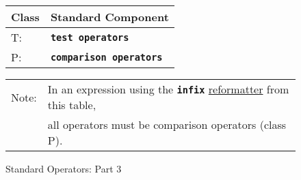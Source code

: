 \documentclass[12pt]{article}
\newcommand{\TT}[1]{{\tt \bfseries #1}}
\begin{document}
\begin{figure*}[!p]
\begin{center}
\medskip

\begin{tabular}{ll}
Class & Standard Component
\\\hline
T: & \TT{test operators} \\
P: & \TT{comparison operators}
\end{tabular}

\medskip

\begin{tabular}{ll}
Note: & In an expression using the \TT{infix}
        \underline{reformatter} from this table, \\
      & all operators must be comparison operators (class P). \\
\end{tabular}

\end{center}
\caption{Standard Operators: Part 3}
\label{STANDARD-OPERATORS-3}
\end{figure*}

\clearpage
\end{document}
